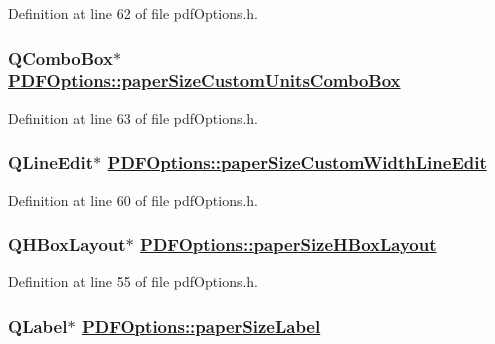 Definition at line 62 of file pdf\-Options.h.\hypertarget{classPDFOptions_r25}{
\subsubsection[paperSizeCustomUnitsComboBox]{\setlength{\rightskip}{0pt plus 5cm}QCombo\-Box$\ast$ \hyperlink{classPDFOptions_r25}{PDFOptions::paper\-Size\-Custom\-Units\-Combo\-Box}}}
\label{classPDFOptions_r25}


Definition at line 63 of file pdf\-Options.h.\hypertarget{classPDFOptions_r22}{
\subsubsection[paperSizeCustomWidthLineEdit]{\setlength{\rightskip}{0pt plus 5cm}QLine\-Edit$\ast$ \hyperlink{classPDFOptions_r22}{PDFOptions::paper\-Size\-Custom\-Width\-Line\-Edit}}}
\label{classPDFOptions_r22}


Definition at line 60 of file pdf\-Options.h.\hypertarget{classPDFOptions_r17}{
\subsubsection[paperSizeHBoxLayout]{\setlength{\rightskip}{0pt plus 5cm}QHBox\-Layout$\ast$ \hyperlink{classPDFOptions_r17}{PDFOptions::paper\-Size\-HBox\-Layout}}}
\label{classPDFOptions_r17}


Definition at line 55 of file pdf\-Options.h.\hypertarget{classPDFOptions_r16}{
\subsubsection[paperSizeLabel]{\setlength{\rightskip}{0pt plus 5cm}QLabel$\ast$ \hyperlink{classPDFOptions_r16}{PDFOptions::paper\-Size\-Label}}}
\label{classPDFOptions_r16}


